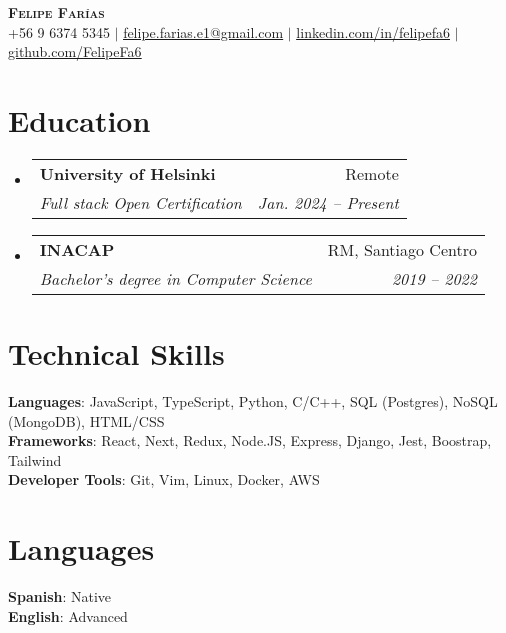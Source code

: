 \documentclass[letterpaper,11pt]{article}
\makeatletter
\newcommand{\resumeSubheading}[4]{
  \vspace{-2pt}\item
    \begin{tabular*}{0.97\textwidth}[t]{l@{\extracolsep{\fill}}r}
      \textbf{#1} & #2 \\
      \textit{\small#3} & \textit{\small #4} \\
    \end{tabular*}\vspace{-7pt}
}
\newcommand{\resumeSubHeadingListStart}{\begin{itemize}[leftmargin=0.15in, label={}]}
\newcommand{\resumeSubHeadingListEnd}{\end{itemize}}
\makeatother
\begin{document}
\begin{center}
    \textbf{\Huge \scshape Felipe Farías } \\ \vspace{2pt}
    \small +56 9 6374 5345 $|$ \href{mailto:felipe.farias.e1@gmail.com}{\underline{felipe.farias.e1@gmail.com}} $|$ 
    \href{https://www.linkedin.com/in/felipefa6/}{\underline{linkedin.com/in/felipefa6}} $|$
    \href{https://github.com/FelipeFa6}{\underline{github.com/FelipeFa6}}
\end{center}


\section{Education}
  \resumeSubHeadingListStart
    \resumeSubheading
      {University of Helsinki}{Remote}
      {Full stack Open Certification}{Jan. 2024 -- Present}
    \resumeSubheading
      {INACAP}{RM, Santiago Centro}
      {Bachelor’s degree in Computer Science}{2019 -- 2022}
  \resumeSubHeadingListEnd

%
\section{Technical Skills}
 \begin{itemize}[leftmargin=0.15in, label={}]
    \small{\item{
     \textbf{Languages}{: JavaScript, TypeScript, Python, C/C++, SQL (Postgres), NoSQL (MongoDB), HTML/CSS} \\
     \textbf{Frameworks}{: React, Next, Redux, Node.JS, Express, Django, Jest, Boostrap, Tailwind} \\
     \textbf{Developer Tools}{: Git, Vim, Linux, Docker, AWS} \\
    }}
 \end{itemize}

\section{Languages}
 \begin{itemize}[leftmargin=0.15in, label={}]
    \small{\item{
     \textbf{Spanish}{: Native} \\
     \textbf{English}{: Advanced} \\
    }}
 \end{itemize}
\end{document}
